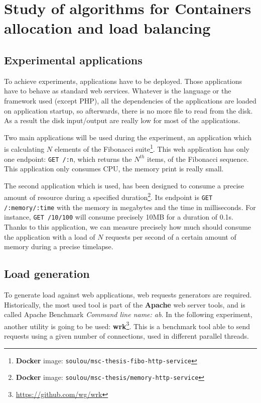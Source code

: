 \chapter{Study of algorithms for Containers allocation and load balancing}
\label{chapt:containerloadbalance}

\section{Experimental applications}

To achieve experiments, applications have to be deployed. Those applications
have to behave as standard web services. Whatever is the language or the
framework used (except PHP), all the dependencies of the applications are
loaded on application startup, so afterwards, there is no more file to read
from the disk.  As a result the disk input/output are really low for most of
the applications.

Two main applications will be used during the experiment, an application which
is calculating $N$ elements of the Fibonacci suite\footnote{\textbf{Docker}
image: \texttt{soulou/msc-thesis-fibo-http-service}}. This weh application has
only one endpoint: \texttt{GET /:n}, which returns the $N^{th}$ items, of the
Fibonacci sequence. This application only consumes CPU, the memory print is
really small.

The second application which is used, has been designed to consume a precise
amount of resource during a specified duration\footnote{\textbf{Docker} image:
\texttt{soulou/msc-thesis/memory-http-service}}. Its endpoint is \texttt{GET
/:memory/:time} with the memory in megabytes and the time in milliseconds. For
instance, \texttt{GET /10/100} will consume precisely 10MB for a duration of
0.1s. Thanks to this application, we can measure precisely how much should
consume the application with a load of $N$ requests per second of a certain
amount of memory during a precise timelapse.

\section{Load generation}

To generate load against web applications, web requests generators are
required.  Historically, the most used tool is part of the \textbf{Apache} web
server tools, and is called Apache Benchmark \textit{Command line name: ab}. In
the following experiment, another utility is going to be used:
\textbf{wrk}\footnote{\url{https://github.com/wg/wrk}}. This is a benchmark
tool able to send requests using a given number of connections, used in different
parallel threads.



